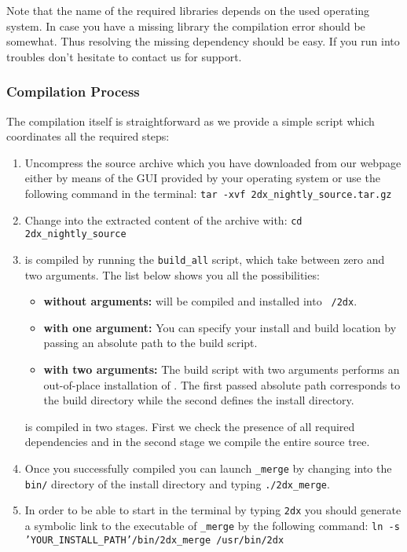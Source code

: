 Note that the name of the required libraries depends on the used operating system. In case you have a missing library the compilation error should be somewhat. Thus resolving the missing dependency should be easy. If you run into troubles don't hesitate to contact us for support.


\subsubsection{Compilation Process}
The compilation itself is straightforward as we provide a simple script which coordinates all the required steps:

\begin{enumerate}
	\item Uncompress the source archive which you have downloaded from our webpage either by means of the GUI provided by your operating system or use the following command in the terminal:
	\newline
	\texttt{tar -xvf 2dx\_nightly\_source.tar.gz}
	
	\item Change into the extracted content of the archive with:
		\newline 
	\texttt{cd 2dx\_nightly\_source}

	\item {\twodx} is compiled by running the \texttt{build\_all} script, which take between zero and two arguments. The list below shows you all the possibilities:
	\begin{itemize}
		\item \textbf{without arguments:} {\twodx} will be compiled and installed into \texttt{~/2dx}.
		\item \textbf{with one argument:} You can specify your install and build location by passing an absolute path to the build script.
		\item \textbf{with two arguments:} The build script with two arguments performs an out-of-place installation of {\twodx}. The first passed absolute path corresponds to the build directory while the second defines the install directory.  
	\end{itemize}
	
	{\twodx} is compiled in two stages. First we check the presence of all required dependencies and in the second stage we compile the entire source tree.
	
	\item Once you successfully compiled {\twodx} you can launch {\twodx}\texttt{\_merge} by changing into the \texttt{bin/} directory of the install directory and typing \texttt{./2dx\_merge}.
	
	\item In order to be able to start {\twodx} in the terminal by typing \texttt{2dx} you should generate a symbolic link to the executable of {\twodx}\texttt{\_merge} by the following command:\newline
	\texttt{ln -s 'YOUR\_INSTALL\_PATH'/bin/2dx\_merge /usr/bin/2dx}
	
\end{enumerate}





